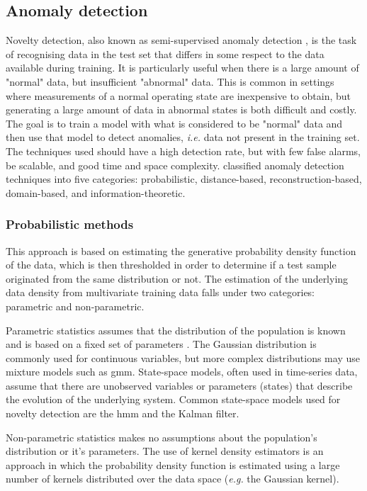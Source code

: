 \subsection{Anomaly detection}

Novelty detection, also known as semi-supervised anomaly detection \citep{Scikit-learn-novelty_detection}, is the task of recognising data in the test set that differs in some respect to the data available during training. It is particularly useful when there is a large amount of "normal" data, but insufficient "abnormal" data. This is common in settings where measurements of a normal operating state are inexpensive to obtain, but generating a large amount of data in abnormal states is both difficult and costly. The goal is to train a model with what is considered to be "normal" data and then use that model to detect anomalies, \textit{i.e.} data not present in the training set. The techniques used should have a high detection rate, but with few false alarms, be scalable, and good time and space complexity. \cite{pimentel2014review} classified anomaly detection techniques into five categories: probabilistic, distance-based, reconstruction-based, domain-based, and information-theoretic.

\subsubsection{Probabilistic methods}

This approach is based on estimating the generative probability density function of the data, which is then thresholded in order to determine if a test sample originated from the same distribution or not. The estimation of the underlying data density from multivariate training data falls under two categories: parametric and non-parametric.\par

Parametric statistics assumes that the distribution of the population is known and is based on a fixed set of parameters \citep{IBM_ParatericStatistics}. The Gaussian distribution is commonly used for continuous variables, but more complex distributions may use mixture models such as \gls{gmm}. State-space models, often used in time-series data, assume that there are unobserved variables or parameters (states) that describe the evolution of the underlying system. Common state-space models used for novelty detection are the \gls{hmm} and the Kalman filter.\par

Non-parametric statistics makes no assumptions about the population's distribution or it's parameters. The use of kernel density estimators is an approach in which the probability density function is estimated using a large number of kernels distributed over the data space (\textit{e.g.} the Gaussian kernel).\par

